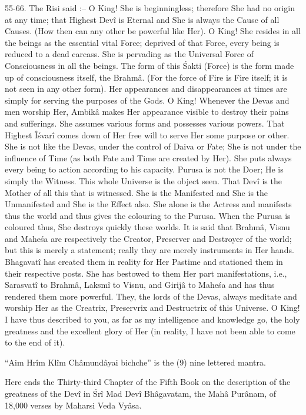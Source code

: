 55-66. The Risi said :-- O King! She is beginningless; therefore She had no origin at any time; that Highest Dev\^i is Eternal and She is always the Cause of all Causes. (How then can any other be powerful like Her). O King! She resides in all the beings as the essential vital Force; deprived of that Force, every being is reduced to a dead carcass. She is pervading as the Universal Force of Consciousness in all the beings. The form of this \'Sakti (Force) is the form made up of consciousness itself, the Brahm\^a. (For the force of Fire is Fire itself; it is not seen in any other form). Her appearances and disappearances at times are simply for serving the purposes of the Gods. O King! Whenever the Devas and men worship Her, Ambik\^a makes Her appearance visible to destroy their pains and sufferings. She assumes various forms and possesses various powers. That Highest Î\'svar\^i comes down of Her free will to serve Her some purpose or other. She is not like the Devas, under the control of Daiva or Fate; She is not under the influence of Time (as both Fate and Time are created by Her). She puts always every being to action according to his capacity. Purusa is not the Doer; He is simply the Witness. This whole Universe is the object seen. That Dev\^i is the Mother of all this that is witnessed. She is the Manifested and She is the Unmanifested and She is the Effect also. She alone is the Actress and manifests thus the world and thus gives the colouring to the Purusa. When the Purusa is coloured thus, She destroys quickly these worlds. It is said that Brahm\^a, Visnu and Mahe\'sa are respectively the Creator, Preserver and Destroyer of the world; but this is merely a statement; really they are merely instruments in Her hands. Bhagavat\^i has created them in reality for Her Pastime and stationed them in their respective posts. She has bestowed to them Her part manifestations, i.e., Sarasvat\^i to Brahm\^a, Laksm\^i to Visnu, and Girij\^a to Mahe\'sa and has thus rendered them more powerful. They, the lords of the Devas, always meditate and worship Her as the Creatrix, Preservrix and Destructrix of this Universe. O King! I have thus described to you, as far as my intelligence and knowledge go, the holy greatness and the excellent glory of Her (in reality, I have not been able to come to the end of it).

``Aim Hr\^im Kl\^im Ch\^amund\^ayai bichche'' is the (9) nine lettered mantra.

Here ends the Thirty-third Chapter of the Fifth Book on the description of the greatness of the Dev\^i in \'Sr\^i Mad Dev\^i Bh\^agavatam, the Mah\^a Pur\^anam, of 18,000 verses by Maharsi Veda Vy\^asa.